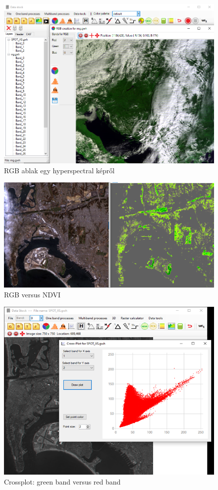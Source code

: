 \documentclass[a4paper,12pt]{article}
\begin{document}
\begin{figure}
	\centering
	\includegraphics[width=12cm]{ds1.png}
	\caption{RGB ablak egy hyperspectral képről}
	\label{fig:ds1}
\end{figure}

\begin{figure}
	\centering
	\includegraphics[width=12cm]{ndvi.png}
	\caption{RGB versus NDVI}
	\label{fig:ndvi}
\end{figure}

\begin{figure}
	\centering
	\includegraphics[width=12cm]{crossplot.png}
	\caption{Crossplot: green band versus red band}
	\label{fig:crossplot}
\end{figure}
\end{document}
